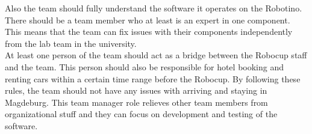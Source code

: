 Also the team should fully understand the software it operates on the Robotino. There should be a team member who at least is an expert in one component. This means that the team can fix issues with their components independently from the lab team in the university. \\
 
At least one person of the team should act as a bridge between the Robocup staff and the team. This person should also be responsible for hotel booking and renting cars within a certain time range before the Robocup. By following these rules, the team should not have any issues with arriving and staying in Magdeburg. This team manager role relieves other team members from organizational stuff and they can focus on development and testing of the software.     
 
